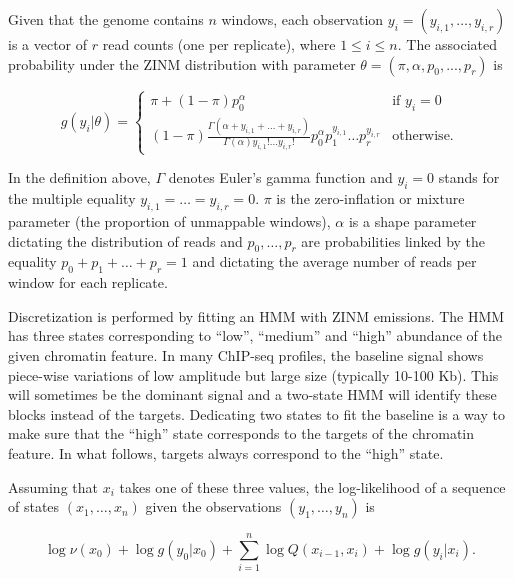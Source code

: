 \documentclass{bioinfo}
\begin{document}
\begin{methods}
Given that the genome contains $n$ windows, each observation
$y_i = (y_{i,1}, \ldots, y_{i,r})$ is a vector of $r$ read counts
(one per replicate), where $1 \leq i \leq n$. The associated probability
under the ZINM distribution with parameter
$\theta = (\pi, \alpha, p_0, ..., p_r)$ is

$$
g(y_i|\theta) = \left\{
\begin{array}{ll}
\pi + (1-\pi)p_0^{\alpha}
         & \mbox{if } y_i = 0 \\
(1-\pi )\frac{\Gamma(\alpha + y_{i,1} + \ldots + y_{i,r})}
  {\Gamma(\alpha)y_{i,1}! \ldots y_{i,r}!}
p_0^{\alpha} p_1^{y_{i,1}} \ldots p_r^{y_{i,r}}
         & \mbox{otherwise.}
\end{array}
\right.
$$

In the definition above, $\Gamma$ denotes Euler's gamma function and
$y_i = 0$ stands for the multiple equality $y_{i,1} = \ldots = y_{i,r} = 0$.
$\pi$ is the zero-inflation or mixture parameter (the proportion of
unmappable windows), $\alpha$ is a shape parameter dictating the
distribution of reads and $p_0, \ldots, p_r$ are probabilities linked
by the equality $p_0 + p_1 + \ldots + p_r = 1$ and dictating the average
number of reads per window for each replicate.

Discretization is performed by fitting an HMM
with ZINM emissions. The HMM has three
states corresponding to ``low'', ``medium'' and ``high'' abundance of
the given chromatin feature. In many ChIP-seq
profiles, the baseline signal shows piece-wise variations of low amplitude
but large size (typically 10-100 Kb). This will sometimes be the dominant
signal and a two-state HMM will identify these blocks instead of the
targets. Dedicating two states to fit the baseline is a way to make sure
that the ``high'' state corresponds to the targets of the chromatin
feature. In what follows, targets always correspond to
the ``high'' state.

Assuming that $x_i$ takes one of these three values, the log-likelihood of
a sequence of states $(x_1, \ldots, x_n)$ given the observations
$(y_1, \ldots, y_n)$ is

$$
\log \nu(x_0) + \log g(y_0|x_0) +
   \sum_{i=1}^n \log Q(x_{i-1},x_i) + \log g(y_i|x_i).
$$


\end{methods}
\end{document}

